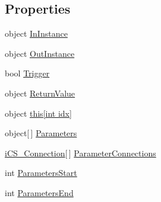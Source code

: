 \subsection*{Properties}
\begin{DoxyCompactItemize}
\item 
object \hyperlink{classi_c_s___action_with_signature_a5197b643c6f412b39367e35d2d3ee346}{In\+Instance}
\item 
object \hyperlink{classi_c_s___action_with_signature_a04da5cdc43cc8a65dd2f21d4807144fe}{Out\+Instance}
\item 
bool \hyperlink{classi_c_s___action_with_signature_a47ac3a636fbae29756df4363b3c17921}{Trigger}
\item 
object \hyperlink{classi_c_s___action_with_signature_a8d31da597b92386c24a98cd15c3613c8}{Return\+Value}
\item 
object \hyperlink{classi_c_s___action_with_signature_afe215e8c8ba7125f1a7fba5d5c916362}{this\mbox{[}int idx\mbox{]}}
\item 
object\mbox{[}$\,$\mbox{]} \hyperlink{classi_c_s___action_with_signature_ab9e87c3f58d73d145776d73f11b7b678}{Parameters}
\item 
\hyperlink{classi_c_s___connection}{i\+C\+S\+\_\+\+Connection}\mbox{[}$\,$\mbox{]} \hyperlink{classi_c_s___action_with_signature_aa5c7f65ab7536ce9bb086d16b1bdab20}{Parameter\+Connections}
\item 
int \hyperlink{classi_c_s___action_with_signature_a2c576ffb477b90777ecb46852a29b556}{Parameters\+Start}
\item 
int \hyperlink{classi_c_s___action_with_signature_a9b1240f8a79c7713110174d00127ac6b}{Parameters\+End}
\end{DoxyCompactItemize}


